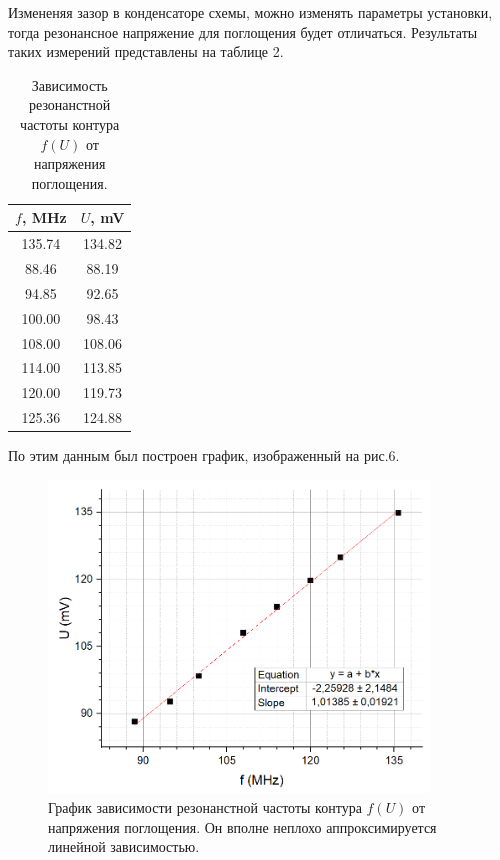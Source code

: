 \documentclass[a4paper, 14pt]{extarticle}%
\newcommand\ECaption[1]{%
     \captionsetup{font=footnotesize}%
     \caption{#1}}
\begin{document}
Измененяя зазор в конденсаторе схемы, можно изменять параметры установки, тогда резонансное напряжение для поглощения будет отличаться. Результаты таких измерений представлены на таблице 2.

\begin{table}[h!]
\begin{center}
\begin{tabular}{|c|c|}
\hline
\rowcolor[HTML]{9698ED} 
$f$, MHz & $U$, mV \\ \hline
135.74   & 134.82  \\ \hline
\rowcolor[HTML]{9698ED} 
88.46    & 88.19   \\ \hline
94.85    & 92.65   \\ \hline
\rowcolor[HTML]{9698ED} 
100.00   & 98.43   \\ \hline
108.00   & 108.06  \\ \hline
\rowcolor[HTML]{9698ED} 
114.00   & 113.85  \\ \hline
120.00   & 119.73  \\ \hline
\rowcolor[HTML]{9698ED} 
125.36   & 124.88  \\ \hline
\end{tabular}
\ECaption{Зависимость резонанстной частоты контура $f(U)$ от напряжения поглощения.}
\end{center}
\end{table}

По этим данным был построен график, изображенный на рис.6.

\begin{figure}[h]
\begin{center}
\includegraphics[width=0.9\textwidth]{gr2}
\ECaption{График зависимости резонанстной частоты контура $f(U)$ от напряжения поглощения. Он вполне неплохо аппроксимируется линейной зависимостью.}
\end{center}
\end{figure}
\end{document}
